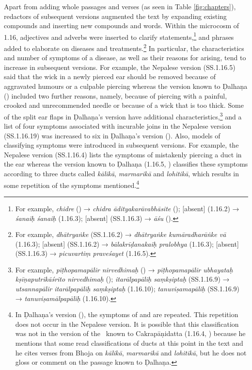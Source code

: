 Apart from adding whole passages and verses (as seen in Table \ref{fig:chapters}),
redactors of subsequent versions augmented the text by expanding existing
compounds and inserting new compounds and words. Within the microcosm of 1.16,
adjectives and adverbs were inserted to clarify statements,\footnote{For example,
    \emph{chidre} () → \emph{chidra ādityakarāvabhāsite}
    (); [absent] (1.16.2) → \emph{śanaiḥ śanaiḥ} (1.16.3); 
    [absent] (SS.1.16.3) → \emph{āśu} ().} and phrases added to
    elaborate on diseases and treatments.\footnote{For example, \emph{dhātryaṅke}
        (SS.1.16.2) → \emph{dhātryaṅke kumāradharāṅke vā} (1.16.3); [absent] (SS.1.16.2) →
        \emph{bālakrīḍanakaiḥ pralobhya} (1.16.3);  [absent] (SS.1.16.3) →
        \emph{picuvartiṃ praveśayet} (1.16.5).} In particular, the characteristics and
        number of symptoms of a disease, as well as their reasons for arising, tend to
        increase in subsequent versions. For example, the Nepalese version (SS.1.16.5)
        said that the wick in a newly pierced ear should be removed because of aggravated
        humours or a culpable piercing whereas the version known to Ḍalhaṇa 
        () included two further reasons, namely, because of piercing with
        a painful, crooked and unrecommended needle or because of a wick that is too
        thick. Some of the split ear flaps in Ḍalhaṇa's version have additional
        characteristics,\footnote{For example, \emph{pīṭhopamapālir nirvedhimaḥ}
            () → \emph{pīṭhopamapālir ubhayataḥ kṣīṇaputrikāśrito
            nirvedhimaḥ} (); \emph{itarālpapāliḥ saṃkṣiptaḥ} 
            (SS.1.16.9)
            → \emph{utsannapālir itarālpapāliḥ saṃkṣiptaḥ} (1.16.10); \emph{tanuviṣamapāliḥ}
            (SS.1.16.9) → \emph{tanuviṣamālpapāliḥ} (1.16.10).} and a list of four symptoms
            associated with incurable joins in the Nepalese version (SS.1.16.19) was increased
            to six in Ḍalhaṇa's version (). Also, models of
            classifying symptoms were introduced in subsequent versions. For example, the
            Nepalese version (SS.1.16.4) lists the symptoms of mistakenly piercing a duct in
            the ear whereas the version known to Ḍalhaṇa (1.16.5, \cite[76–77]{vulgate})
            classifies these symptoms according to three ducts called \emph{kālikā},
            \emph{marmarikā} and \emph{lohitikā}, which results in some repetition of the
            symptoms mentioned.\footnote{In Ḍalhaṇa's version  (), 
            the
                symptoms of  and  are repeated. This 
                repetition
                does not occur in the Nepalese version. It is possible that this classification
                was not in the version of the \SS\ known to Cakrapāṇidatta (1.16.4,
                \cite[126]{acar-1939}) because he mentions that some read classifications of ducts
                at this point in the text and he cites verses from Bhoja on \emph{kālikā},
                \emph{marmarikā} and \emph{lohitikā}, but he does not gloss or comment on the
                passage known to Ḍalhaṇa.}

